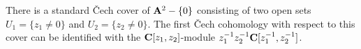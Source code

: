 \documentclass[../main.tex]{subfiles}
\begin{document}
\begin{rmk}
There is a standard \v{C}ech cover of ${\mathbf{A}}^2 - \{0\}$ consisting of two open sets $U_1 = \{z_1 \ne 0\}$ and $U_2 = \{z_2 \ne 0\}$.
The first \v{C}ech cohomology with respect to this cover can be identified with the $\mathbf{C}[z_1,z_2]$-module $z_1^{-1} z_2^{-1} \mathbf{C}[z_1^{-1},z_2^{-1}]$.
\end{rmk}



%
%
%
%
%
%
%
%
%
%
\end{document}
